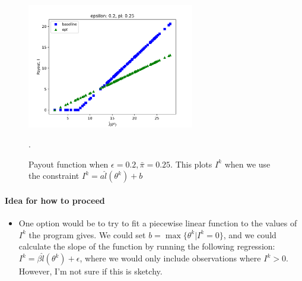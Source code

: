 \documentclass[11pt]{article}
\begin{document}
\begin{figure}[H]
    \centering
    \includegraphics[width=0.65\textwidth]{linear_example.png}
    \caption{Payout function when $\epsilon=0.2, \bar{\pi}=0.25$. This plots $I^k$ when we use the constraint $I^k = a\hat{l}(\theta^k) + b$}. 
\end{figure}


\paragraph*{Idea for how to proceed}
\begin{itemize}
    \item One option would be to try to fit a piecewise linear function to the values of $I^k$ the program gives. We could set $b= \max \{\theta^k | I^k =0\}$, and we could calculate the slope of the function by running the following regression: $I^k = \beta \hat{l}(\theta^k)+\epsilon$, where we would only include observations where $I^k > 0$. However, I'm not sure if this is sketchy. 
\end{itemize}
\end{document}
